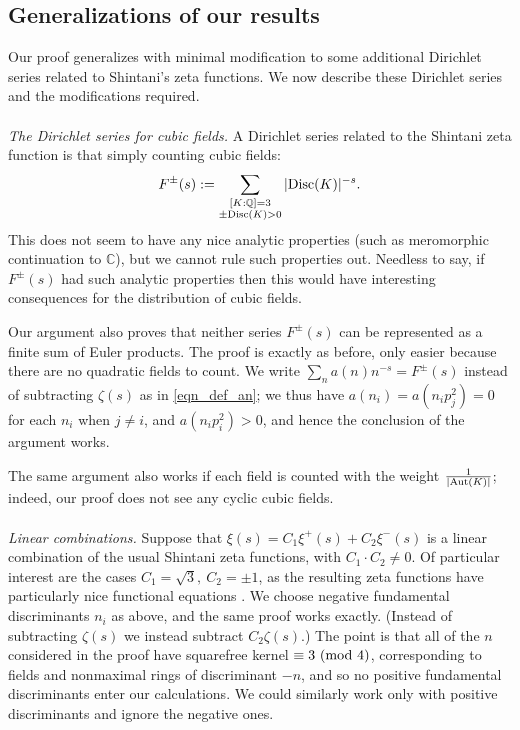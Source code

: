 \documentclass[12pt]{amsart}
\theoremstyle{remark}
\numberwithin{theorem}{section} \numberwithin{equation}{section}
\newcommand{\Aut}{{\text {\rm Aut}}}
\newcommand{\Q}{\mathbb{Q}}
\newcommand{\textmod}{{\text {\rm mod}}}
\newcommand{\Disc}{\textnormal{Disc}}
\begin{document}
\subsection{Generalizations of our results}
Our proof generalizes with minimal modification to some additional Dirichlet series related to Shintani's zeta functions. We now describe these
Dirichlet series and the modifications required.
\\
\\
{\itshape The Dirichlet series for cubic fields.} A Dirichlet series related to the Shintani zeta function is that
simply counting cubic fields:
\begin{equation}
F^{\pm}(s) := \sum_{\substack{[K : \Q] = 3 \\ \pm \Disc(K) > 0}} |\Disc(K)|^{-s}.
\end{equation}
This does not seem to have any nice analytic properties (such as meromorphic continuation to $\mathbb{C}$),
but we cannot rule such properties out. Needless to say, if $F^{\pm}(s)$ had such analytic properties then
this would have interesting consequences for the distribution of cubic fields.

Our argument also proves that neither series $F^{\pm}(s)$ can be represented as a finite sum of Euler
products. The proof is exactly as before, only easier because there are no quadratic fields to count.
We write
$\sum_n a(n) n^{-s} = F^{\pm}(s)$ instead of subtracting $\zeta(s)$ as in \eqref{eqn_def_an}; we thus
have $a(n_i) = a(n_i p_j^2) = 0$ for each $n_i$ when $j \neq i$, and $a(n _i p_i^2) > 0$, and hence the conclusion of the argument works.

The same argument also works if each field is counted with the weight $\frac{1}{|\Aut(K)|}$; indeed, our proof does not
see any cyclic cubic fields.
\\
\\
{\itshape Linear combinations.} Suppose that $\xi(s) = C_1 \xi^+(s) + C_2 \xi^-(s)$ is a linear combination of the usual
Shintani zeta functions, with $C_1 \cdot C_2 \neq 0$. Of particular interest are the cases $C_1 = \sqrt{3}, \ C_2 = \pm 1$,
as the resulting zeta functions have particularly nice functional equations \cite{DW2, N, O}.
We choose negative fundamental discriminants
$n_i$ as above, and the same proof works exactly. (Instead of subtracting $\zeta(s)$ we instead subtract
$C_2 \zeta(s)$.) The point is that all of the $n$ considered in the proof have squarefree kernel $\equiv 3 \ (\textmod \ 4)$,
corresponding to fields and nonmaximal rings of discriminant $-n$, 
and so no positive fundamental discriminants enter our calculations. We could similarly work only with positive discriminants
and ignore the negative ones.
\end{document}
